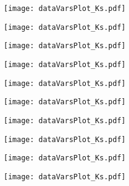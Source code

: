 \begin{figure}[H]
\ContinuedFloat
\begin{subfigure}{0.5\linewidth}
\texttt{[image: dataVarsPlot\_Ks.pdf]}
\end{subfigure}
\begin{subfigure}{0.5\linewidth}
\texttt{[image: dataVarsPlot\_Ks.pdf]}
\end{subfigure}
\begin{subfigure}{0.5\linewidth}
\texttt{[image: dataVarsPlot\_Ks.pdf]}
\end{subfigure}
\begin{subfigure}{0.5\linewidth}
\texttt{[image: dataVarsPlot\_Ks.pdf]}
\end{subfigure}
\begin{subfigure}{0.5\linewidth}
\texttt{[image: dataVarsPlot\_Ks.pdf]}
\end{subfigure}
\begin{subfigure}{0.5\linewidth}
\texttt{[image: dataVarsPlot\_Ks.pdf]}
\end{subfigure}
\begin{subfigure}{0.5\linewidth}
\texttt{[image: dataVarsPlot\_Ks.pdf]}
\end{subfigure}
\begin{subfigure}{0.5\linewidth}
\texttt{[image: dataVarsPlot\_Ks.pdf]}
\end{subfigure}
\begin{subfigure}{0.5\linewidth}
\texttt{[image: dataVarsPlot\_Ks.pdf]}
\end{subfigure}
\begin{subfigure}{0.5\linewidth}
\texttt{[image: dataVarsPlot\_Ks.pdf]}
\end{subfigure}
\end{figure}

